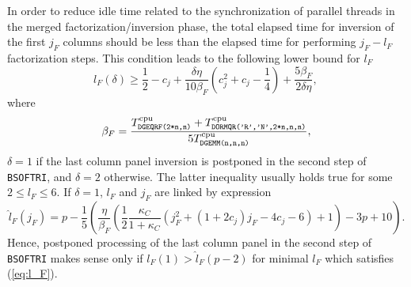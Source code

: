 \documentclass{llncs}
\newcommand{\Bsoftri}{\texttt{BSOFTRI}\xspace}
\begin{document}
In order to reduce idle time 
related to 
the synchronization of parallel threads 
in the merged factorization/inversion phase, 
the total elapsed time for inversion of the first $j_F$ columns
should be less than 
the elapsed time for performing $j_F-l_F$ factorization steps.
This condition leads to the following lower bound for $l_F$
\begin{equation}
  \label{eq:l_F}
  l_{F}(\delta) \ge
  \frac{1}{2} - c_{j} + \frac{\delta \eta}{10 \beta_F } 
  \left( c_{j}^{2} + c_{j}  - \frac{1}{4} \right) + \frac{5 \beta_F }{2 \delta \eta}
  , \,
\end{equation}
where 
\begin{equation*}
  \beta_F  = \frac{T^{\rm cpu}_{\texttt{DGEQRF(2*n,n)}} + T^{\rm cpu}_{\texttt{DORMQR('R','N',2*n,n,n)}}}{5 T^{\rm cpu}_{\texttt{DGEMM(n,n,n)}}},
\end{equation*}
$\delta=1$ if the last column panel inversion 
is postponed in the second step of \Bsoftri,
and $\delta=2$ otherwise. 
The latter inequality usually holds true for some $2 \le l_F \le 6$.
If $\delta=1$, $l_F$ and $j_F$ are linked by expression
\begin{equation*}
  \label{eq:l_F2}
  \hat{l}_F(j_F) = p - {\frac{1}{5}\left(\frac{\eta}{\beta_{F} } 
      \left( \frac{1}{2}\frac{\kappa_{C}}{1+\kappa_{C}} 
      \left(j_F^2 + (1+2c_j)j_F  - 4 c_j - 6 \right) 
        + 1 \right) - 3 p +  10\right) }
  .
\end{equation*}
Hence, postponed processing of the last column panel in the second step of \Bsoftri 
makes sense only if $l_F(1) > \hat{l}_F(p-2)$
for minimal $l_F$ which satisfies (\ref{eq:l_F}).
\end{document}
